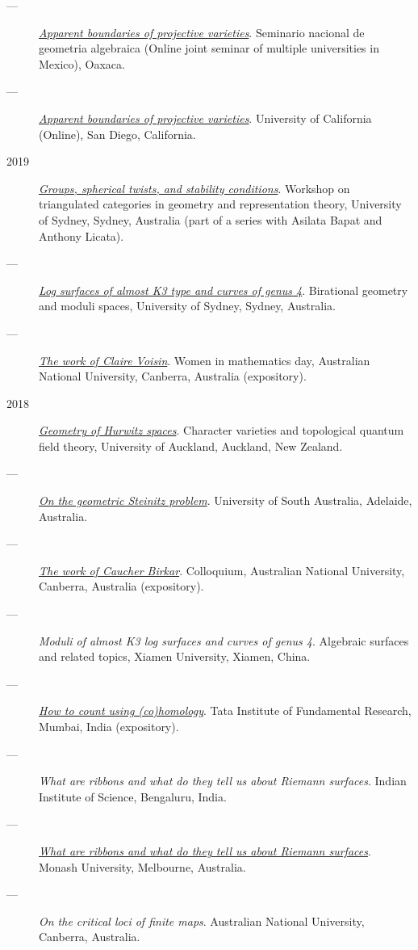 \documentclass[11pt]{article}
\begin{document}
\begin{description}
\item[{---}] \emph{\href{talks/PR2020-Oaxaca.pdf}{Apparent boundaries of projective varieties}}. Seminario nacional de geometria algebraica (Online joint seminar of multiple universities in Mexico), Oaxaca.
\item[{---}] \emph{\href{talks/PR2020-UCSD.pdf}{Apparent boundaries of projective varieties}}. University of California (Online), San Diego, California.
\item[{2019}] \emph{\href{talks/StabSydney2019.pdf}{Groups, spherical twists, and stability conditions}}. Workshop on triangulated categories in geometry and representation theory, University of Sydney, Sydney, Australia (part of a series with Asilata Bapat and Anthony Licata).
\item[{---}] \emph{\href{talks/K3Sydney2019.pdf}{Log surfaces of almost K3 type and curves of genus 4}}. Birational geometry and moduli spaces, University of Sydney, Sydney, Australia.
\item[{---}] \emph{\href{talks/WIM2019.pdf}{The work of Claire Voisin}}. Women in mathematics day, Australian National University, Canberra, Australia (expository).
\item[{2018}] \emph{\href{talks/NZ2018.pdf}{Geometry of Hurwitz spaces}}. Character varieties and topological quantum field theory, University of Auckland, Auckland, New Zealand.
\item[{---}] \emph{\href{talks/AustMS2018.pdf}{On the geometric Steinitz problem}}. University of South Australia, Adelaide, Australia.
\item[{---}] \emph{\href{talks/FMColloquium2018.pdf}{The work of Caucher Birkar}}. Colloquium, Australian National University, Canberra, Australia (expository).
\item[{---}] \emph{Moduli of almost K3 log surfaces and curves of genus 4}. Algebraic surfaces and related topics, Xiamen University, Xiamen, China.
\item[{---}] \emph{\href{talks/tifr2018.pdf}{How to count using (co)homology}}. Tata Institute of Fundamental Research, Mumbai, India (expository).
\item[{---}] \emph{What are ribbons and what do they tell us about Riemann surfaces}. Indian Institute of Science, Bengaluru, India.
\item[{---}] \emph{\href{talks/Monash2018.pdf}{What are ribbons and what do they tell us about Riemann surfaces}}. Monash University, Melbourne, Australia.
\item[{---}] \emph{On the critical loci of finite maps}. Australian National University, Canberra, Australia.

\end{description}
\end{document}
